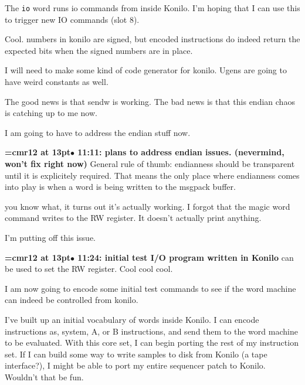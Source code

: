 The {\tt io} word runs io commands from inside Konilo. I'm hoping that I can use this to trigger new IO commands (slot 8).
\par

Cool. numbers in konilo are signed, but encoded instructions do indeed return the expected bits when the signed numbers are in place.
\par

I will need to make some kind of code generator for konilo. Ugens are going to have weird constants as well.
\par

The good news is that sendw is working. The bad news is that this endian chaos is catching up to me now.
\par

I am going to have to address the endian stuff now.
\par

{\smallskip\noindent\bf\font\titlefont=cmr12 at 13pt\titlefont $\bullet$ 11:11: plans to address endian issues. (nevermind, won't fix right now)}\smallskip
General rule of thumb: endianness should be transparent until it is explicitely required. That means the only place where endianness comes into play is when a word is being written to the msgpack buffer.
\par

you know what, it turns out it's actually working. I forgot that the magic word command writes to the RW register. It doesn't actually print anything.
\par

I'm putting off this issue.
\par

{\smallskip\noindent\bf\font\titlefont=cmr12 at 13pt\titlefont $\bullet$ 11:24: initial test I/O program written in Konilo} can be used to set the RW register. Cool cool cool.
\par

I am now going to encode some initial test commands to see if the word machine can indeed be controlled from konilo.
\par

I've built up an initial vocabulary of words inside Konilo. I can encode instructions as, system, A, or B instructions, and send them to the word machine to be evaluated. With this core set, I can begin porting the rest of my instruction set. If I can build some way to write samples to disk from Konilo (a tape interface?), I might be able to port my entire sequencer patch to Konilo. Wouldn't that be fun.
\par

